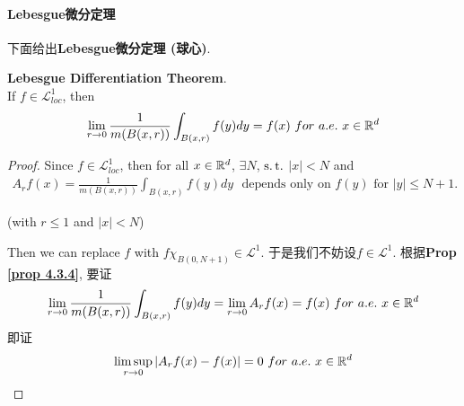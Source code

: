 \newpage
\paragraph{\textbf{Lebesgue}微分定理}
	下面给出\textbf{Lebesgue微分定理 (球心)}.
	\begin{thm}\label{thm 4.3.3}
		\textbf{Lebesgue Differentiation Theorem}. \\
		If $f \in \mathcal{L}_{loc}^{1}$, then
		\begin{align}
			\lim_{r \to 0}{\frac{1}{m(B(x , r))} \int_{B(x , r)}{f(y) dy}} = f(x) \,\, for \,\, a.e. \,\, x \in \mathbb{R}^d
		\end{align}
	
		\vspace{4em}
		\begin{proof}
			Since $f \in \mathcal{L}_{loc}^1$, then for all $x \in \mathbb{R}^d$, $\exists N$, $\operatorname{s.t.}$ $\left| x \right| < N$ and
			\begin{align}
				A_{r}f(x) = \frac{1}{m( B(x , r) )} \int_{B(x , r)}{f(y) dy} \,\,\,\, \text{depends only on $f(y)$ for $\left| y \right| \leq N + 1$.}
			\end{align}
			\begin{center}
				(with $r \leq 1$ and $\left| x \right| < N$)
			\end{center}
			Then we can replace $f$ with $f \chi_{B(0 , N + 1)} \in \mathcal{L}^1$. 于是我们不妨设$f \in \mathcal{L}^1$. 根据\textbf{Prop \ref{prop 4.3.4}}, 要证
			\begin{align}
				\lim_{r \to 0}{\frac{1}{m(B(x , r))} \int_{B(x , r)}{f(y) dy}} 
				= \lim_{r \to 0}{A_{r}f(x)}
				= f(x) \,\, for \,\, a.e. \,\, x \in \mathbb{R}^d
			\end{align}
			即证
			\begin{align}
				\limsup_{r \to 0}{\left| A_{r}f(x) - f(x) \right|} = 0 \,\, for \,\, a.e. \,\, x \in \mathbb{R}^d
			\end{align}
			
			\vspace{2em}
			

\end{proof}
\end{thm}
